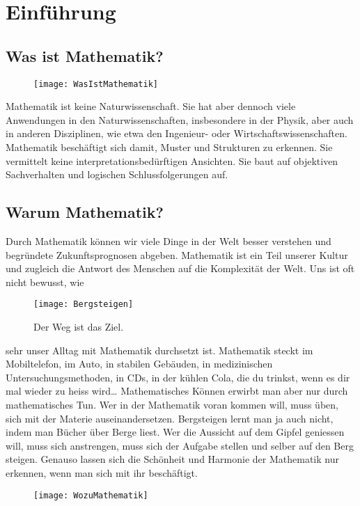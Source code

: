 \chapter{Einführung}
\section{Was ist Mathematik?}
\begin{wrapfigure}{r}{0.45\textwidth}
    \vspace{-.8cm}
	\begin{center}
		\texttt{[image: WasIstMathematik]}
	\end{center}
\end{wrapfigure}
Mathematik ist keine Naturwissenschaft. Sie hat aber dennoch viele Anwendungen in den Naturwissenschaften, insbesondere in der Physik, aber auch in anderen Disziplinen, wie etwa den Ingenieur- oder Wirtschaftswissenschaften.
Mathematik beschäftigt sich damit, Muster und Strukturen zu erkennen. 
Sie vermittelt keine interpretationsbedürftigen Ansichten.
Sie baut auf objektiven Sachverhalten und logischen Schlussfolgerungen auf.\par

\section{Warum Mathematik?}
Durch Mathematik können wir viele Dinge in der Welt besser verstehen und begründete Zukunftsprognosen abgeben.
Mathematik ist ein Teil unserer Kultur und zugleich die Antwort des Menschen auf die Komplexität der Welt.
Uns ist oft nicht bewusst, wie
\begin{wrapfigure}{l}{0.5\textwidth}
    \vspace{-.4cm}
	\begin{center}
		\texttt{[image: Bergsteigen]}
	\end{center}
	\caption{Der Weg ist das Ziel.}
\end{wrapfigure}
sehr unser Alltag mit Mathematik durchsetzt ist.
Mathematik steckt im Mobiltelefon, im Auto, in stabilen Gebäuden, in medizinischen Untersuchungsmethoden, in CDs, in der kühlen Cola, die du trinkst, wenn es dir mal wieder zu heiss wird\ldots
Mathematisches Können erwirbt man aber nur durch mathematisches Tun. Wer in der Mathematik voran kommen will, muss üben, sich mit der Materie auseinandersetzen. Bergsteigen lernt man ja auch nicht, indem man Bücher über Berge liest.
Wer die Aussicht auf dem Gipfel geniessen will, muss sich anstrengen, muss sich der Aufgabe stellen und selber auf den Berg steigen.
Genauso lassen sich die Schönheit und Harmonie der Mathematik nur erkennen, wenn man sich mit ihr beschäftigt.

\begin{figure}
\texttt{[image: WozuMathematik]}
\end{figure}
\thispagestyle{empty}
